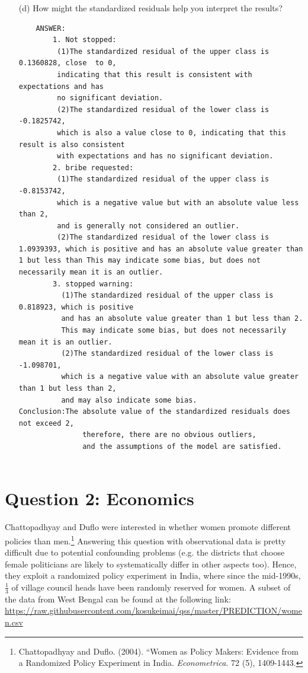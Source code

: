 \documentclass[12pt,letterpaper]{article}
\begin{document}
\begin{enumerate}
	\vspace{7cm}
	\item [(d)] How might the standardized residuals help you interpret the results?  
	\begin{verbatim}
	ANSWER:
		1. Not stopped:
		 (1)The standardized residual of the upper class is 0.1360828, close  to 0, 
		 indicating that this result is consistent with expectations and has 
		 no significant deviation.
		 (2)The standardized residual of the lower class is -0.1825742, 
		 which is also a value close to 0, indicating that this result is also consistent 
		 with expectations and has no significant deviation.
		2. bribe requested:
		 (1)The standardized residual of the upper class is -0.8153742, 
		 which is a negative value but with an absolute value less than 2, 
		 and is generally not considered an outlier.
		 (2)The standardized residual of the lower class is 1.0939393, which is positive and has an absolute value greater than 1 but less than This may indicate some bias, but does not necessarily mean it is an outlier.
		3. stopped warning:
		  (1)The standardized residual of the upper class is 0.818923, which is positive 
		  and has an absolute value greater than 1 but less than 2. 
		  This may indicate some bias, but does not necessarily mean it is an outlier.
		  (2)The standardized residual of the lower class is -1.098701, 
		  which is a negative value with an absolute value greater than 1 but less than 2, 
		  and may also indicate some bias.
Conclusion:The absolute value of the standardized residuals does not exceed 2, 
	           therefore, there are no obvious outliers, 
	           and the assumptions of the model are satisfied.
		
	\end{verbatim}
\end{enumerate}
\newpage

\section*{Question 2: Economics}
Chattopadhyay and Duflo were interested in whether women promote different policies than men.\footnote{Chattopadhyay and Duflo. (2004). ``Women as Policy Makers: Evidence from a Randomized Policy Experiment in India. \textit{Econometrica}. 72 (5), 1409-1443.} Answering this question with observational data is pretty difficult due to potential confounding problems (e.g. the districts that choose female politicians are likely to systematically differ in other aspects too). Hence, they exploit a randomized policy experiment in India, where since the mid-1990s, $\frac{1}{3}$ of village council heads have been randomly reserved for women. A subset of the data from West Bengal can be found at the following link: \url{https://raw.githubusercontent.com/kosukeimai/qss/master/PREDICTION/women.csv}\\
\end{document}
